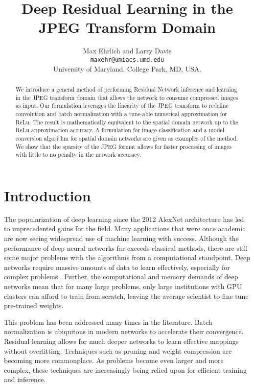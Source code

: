 \documentclass[10pt,twocolumn,letterpaper]{article}
\begin{document}
    
\title{Deep Residual Learning in the JPEG Transform Domain}\author{Max Ehrlich and Larry Davis\\
    {\tt\small maxehr@umiacs.umd.edu} \\
    University of Maryland, College Park, MD, USA.
}\maketitle\begin{abstract}   
    We introduce a general method of performing Residual Network inference and learning in the JPEG transform domain that allows the network to consume compressed images as input. Our formulation leverages the linearity of the JPEG transform to redefine convolution and batch normalization with a tune-able  numerical approximation for ReLu. The result is mathematically equivalent to the spatial domain network up to the ReLu approximation accuracy. A formulation for image classification and a model conversion algorithm for spatial domain networks are given as examples of the method. We show that the sparsity of the JPEG format allows for faster processing of images with little to no penalty in the network accuracy.
\end{abstract}

\section{Introduction}

The popularization of deep learning since the 2012 AlexNet \cite{krizhevsky2012imagenet} architecture has led to unprecedented gains for the field. Many applications that were once academic are now seeing widespread use of machine learning with success. Although the performance of deep neural networks far exceeds classical methods, there are still some major problems with the algorithms from a computational standpoint. Deep networks require massive amounts of data to learn effectively, especially for complex problems \cite{najafabadi2015deep}. Further, the computational and memory demands of deep networks mean that for many large problems, only large institutions with GPU clusters can afford to train from scratch, leaving the average scientist to fine tune pre-trained weights.

This problem has been addressed many times in the literature. Batch normalization \cite{ioffe2015batch} is ubiquitous in modern networks to accelerate their convergence. Residual learning \cite{he2016deep} allows for much deeper networks to learn effective mappings without overfitting. Techniques such as pruning and weight compression  \cite{han2015deep} are becoming more commonplace. As problems become even larger and more complex, these techniques are increasingly being relied upon for efficient training and inference.
\end{document}
